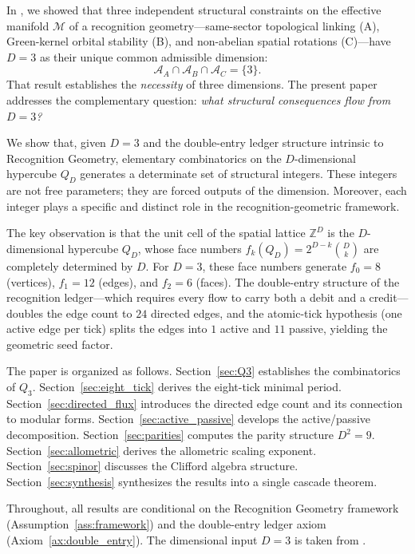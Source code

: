 \documentclass[11pt]{article}
\newcommand{\M}{\mathcal{M}}
\newcommand{\Z}{\mathbb{Z}}
\begin{document}
In \cite{PardoGuerraThapa2026}, we showed that three independent structural constraints on the effective manifold $\M$ of a recognition geometry---same-sector topological linking (A), Green-kernel orbital stability (B), and non-abelian spatial rotations (C)---have $D = 3$ as their unique common admissible dimension:
\[
\mathcal{A}_A \cap \mathcal{A}_B \cap \mathcal{A}_C = \{3\}.
\]
That result establishes the \emph{necessity} of three dimensions.
The present paper addresses the complementary question: \emph{what structural consequences flow from $D = 3$?}

We show that, given $D = 3$ and the double-entry ledger structure intrinsic to Recognition Geometry, elementary combinatorics on the $D$-dimensional hypercube $Q_D$ generates a determinate set of structural integers.
These integers are not free parameters; they are forced outputs of the dimension.
Moreover, each integer plays a specific and distinct role in the recognition-geometric framework.

The key observation is that the unit cell of the spatial lattice $\Z^D$ is the $D$-dimensional hypercube $Q_D$, whose face numbers $f_k(Q_D) = 2^{D-k}\binom{D}{k}$ are completely determined by $D$.
For $D = 3$, these face numbers generate $f_0 = 8$ (vertices), $f_1 = 12$ (edges), and $f_2 = 6$ (faces).
The double-entry structure of the recognition ledger---which requires every flow to carry both a debit and a credit---doubles the edge count to $24$ directed edges, and the atomic-tick hypothesis (one active edge per tick) splits the edges into $1$ active and $11$ passive, yielding the geometric seed factor.

The paper is organized as follows.
Section~\ref{sec:Q3} establishes the combinatorics of $Q_3$.
Section~\ref{sec:eight_tick} derives the eight-tick minimal period.
Section~\ref{sec:directed_flux} introduces the directed edge count and its connection to modular forms.
Section~\ref{sec:active_passive} develops the active/passive decomposition.
Section~\ref{sec:parities} computes the parity structure $D^2 = 9$.
Section~\ref{sec:allometric} derives the allometric scaling exponent.
Section~\ref{sec:spinor} discusses the Clifford algebra structure.
Section~\ref{sec:synthesis} synthesizes the results into a single cascade theorem.

Throughout, all results are conditional on the Recognition Geometry framework (Assumption~\ref{ass:framework}) and the double-entry ledger axiom (Axiom~\ref{ax:double_entry}).
The dimensional input $D = 3$ is taken from \cite{PardoGuerraThapa2026}.
\end{document}
